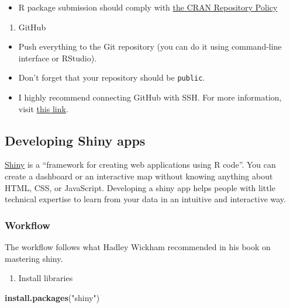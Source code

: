 \documentclass[
]{book}
\newenvironment{Shaded}{\begin{snugshade}}{\end{snugshade}}
\newcommand{\KeywordTok}[1]{\textcolor[rgb]{0.13,0.29,0.53}{\textbf{#1}}}
\newcommand{\NormalTok}[1]{#1}
\newcommand{\StringTok}[1]{\textcolor[rgb]{0.31,0.60,0.02}{#1}}
\providecommand{\tightlist}{%
  \setlength{\itemsep}{0pt}\setlength{\parskip}{0pt}}
\begin{document}
\begin{itemize}
\tightlist
\item
  R package submission should comply with \href{https://cran.r-project.org/}{the CRAN Repository Policy}
\end{itemize}

\begin{enumerate}
\def\labelenumi{\arabic{enumi}.}
\setcounter{enumi}{1}
\tightlist
\item
  GitHub
\end{enumerate}

\begin{itemize}
\item
  Push everything to the Git repository (you can do it using command-line interface or RStudio).
\item
  Don't forget that your repository should be \texttt{public}.
\item
  I highly recommend connecting GitHub with SSH. For more information, visit \href{https://docs.github.com/en/github/authenticating-to-github/connecting-to-github-with-ssh}{this link}.
\end{itemize}

\hypertarget{developing-shiny-apps}{%
\subsection{Developing Shiny apps}\label{developing-shiny-apps}}

\href{https://shiny.rstudio.com/}{Shiny} is a ``framework for creating web applications using R code''. You can create a dashboard or an interactive map without knowing anything about HTML, CSS, or JavaScript. Developing a shiny app helps people with little technical expertise to learn from your data in an intuitive and interactive way.

\hypertarget{workflow-1}{%
\subsubsection{Workflow}\label{workflow-1}}

The workflow follows what Hadley Wickham recommended in his book on mastering shiny.

\begin{enumerate}
\def\labelenumi{\arabic{enumi}.}
\tightlist
\item
  Install libraries
\end{enumerate}

\begin{Shaded}
\begin{Highlighting}[]
\KeywordTok{install.packages}\NormalTok{(}\StringTok{"shiny"}\NormalTok{)}
\end{Highlighting}
\end{Shaded}
\end{document}
